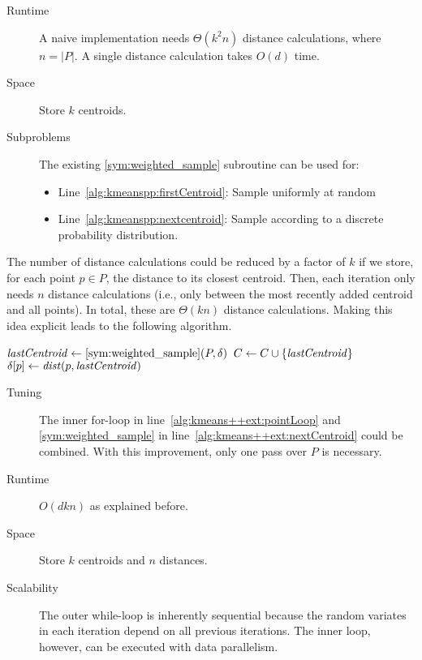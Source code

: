 \begin{description}
	\item[Runtime] A naive implementation needs $\Theta(k^2 n)$ distance calculations, where $n = |P|$. A single distance calculation takes $O(d)$ time.
	\item[Space] Store $k$ centroids.
	\item[Subproblems]
		The existing \ref{sym:weighted_sample} subroutine can be used for:
		\begin{itemize}
			\item Line~\ref{alg:kmeanspp:firstCentroid}: Sample uniformly at random
			\item Line~\ref{alg:kmeanspp:nextcentroid}: Sample according to a discrete probability distribution.
		\end{itemize}
\end{description}

The number of distance calculations could be reduced by a factor of $k$ if we store, for each point $p \in P$, the distance to its closest centroid. Then, each iteration only needs $n$ distance calculations (i.e., only between the most recently added centroid and all points). In total, these are $\Theta(k n)$ distance calculations. Making this idea explicit leads to the following algorithm.

\begin{algorithm} \label{alg:kmeans++ext}
\begin{algorithmic}[1]
	 \label{alg:kmeans++ext:for}
		\State $\mathit{lastCentroid} \leftarrow \ref{sym:weighted_sample}(P, \delta)$ \label{alg:kmeans++ext:nextCentroid} 
		\State $C \leftarrow C \cup \{ \mathit{lastCentroid} \}$
		 \label{alg:kmeans++ext:pointLoop}
				\State $\delta[p] \leftarrow \mathit{dist}(p, \mathit{lastCentroid})$
			\EndIf
		\EndFor
	\EndWhile
\end{algorithmic}
\end{algorithm}

\begin{description}
	\item[Tuning] \label{kmeans++ext:tuning} The inner for-loop in line~\ref{alg:kmeans++ext:pointLoop} and \ref{sym:weighted_sample} in line~\ref{alg:kmeans++ext:nextCentroid} could be combined. With this improvement, only one pass over $P$ is necessary.
	\item[Runtime] $O(dkn)$ as explained before.
	\item[Space] Store $k$ centroids and $n$ distances.
	\item[Scalability] The outer while-loop is inherently sequential because the random variates in each iteration depend on all previous iterations. The inner loop, however, can be executed with data parallelism.
\end{description}

